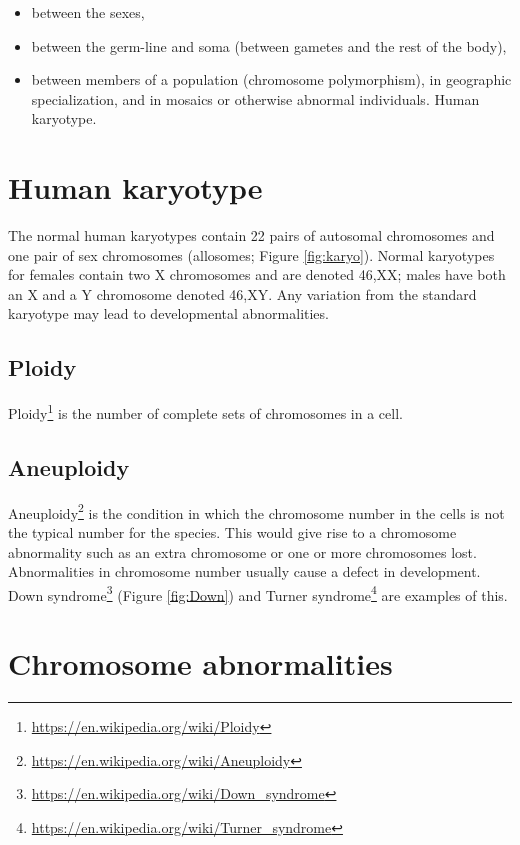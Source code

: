 \documentclass[]{book}
\providecommand{\tightlist}{%
  \setlength{\itemsep}{0pt}\setlength{\parskip}{0pt}}
\let\rmarkdownfootnote\footnote%
\def\footnote{\protect\rmarkdownfootnote}
\renewcommand{\href}[2]{#2\footnote{\url{#1}}}
\theoremstyle{definition}
\theoremstyle{definition}
\theoremstyle{definition}
\theoremstyle{remark}
\begin{document}
\begin{itemize}
\tightlist
\item
  between the sexes,
\item
  between the germ-line and soma (between gametes and the rest of the
  body),
\item
  between members of a population (chromosome polymorphism), in
  geographic specialization, and in mosaics or otherwise abnormal
  individuals. Human karyotype.
\end{itemize}

\section{Human karyotype}\label{human-karyotype}

The normal human karyotypes contain 22 pairs of autosomal chromosomes
and one pair of sex chromosomes (allosomes; Figure \ref{fig:karyo}).
Normal karyotypes for females contain two X chromosomes and are denoted
46,XX; males have both an X and a Y chromosome denoted 46,XY. Any
variation from the standard karyotype may lead to developmental
abnormalities.

\subsection{Ploidy}\label{ploidy}

\href{https://en.wikipedia.org/wiki/Ploidy}{Ploidy} is the number of
complete sets of chromosomes in a cell.

\subsection{Aneuploidy}\label{aneuploidy}

\href{https://en.wikipedia.org/wiki/Aneuploidy}{Aneuploidy} is the
condition in which the chromosome number in the cells is not the typical
number for the species. This would give rise to a chromosome abnormality
such as an extra chromosome or one or more chromosomes lost.
Abnormalities in chromosome number usually cause a defect in
development. \href{https://en.wikipedia.org/wiki/Down_syndrome}{Down
syndrome} (Figure \ref{fig:Down}) and
\href{https://en.wikipedia.org/wiki/Turner_syndrome}{Turner syndrome}
are examples of this.

\section{Chromosome abnormalities}\label{chromosome-abnormalities}
\end{document}
